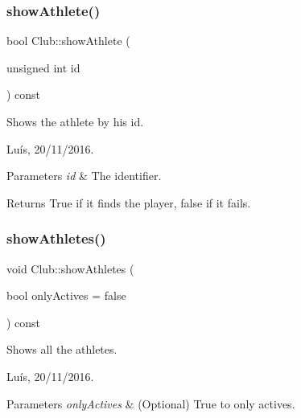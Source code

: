 \hypertarget{class_club_a0a4b9097d0be7470b4a547c13a86adcb}{}\label{class_club_a0a4b9097d0be7470b4a547c13a86adcb} 
\subsubsection{\texorpdfstring{show\+Athlete()}{showAthlete()}}
{\footnotesize\ttfamily bool Club\+::show\+Athlete (\begin{DoxyParamCaption}\item[{unsigned int}]{id }\end{DoxyParamCaption}) const}



Shows the athlete by his id. 

Luís, 20/11/2016. 


\begin{DoxyParams}{Parameters}
{\em id} & The identifier. \\
\hline
\end{DoxyParams}


\begin{DoxyReturn}{Returns}
True if it finds the player, false if it fails. 
\end{DoxyReturn}
\hypertarget{class_club_ab74a638a755a3d7b1239f418f8257c19}{}\label{class_club_ab74a638a755a3d7b1239f418f8257c19} 
\subsubsection{\texorpdfstring{show\+Athletes()}{showAthletes()}}
{\footnotesize\ttfamily void Club\+::show\+Athletes (\begin{DoxyParamCaption}\item[{bool}]{only\+Actives = {\ttfamily false} }\end{DoxyParamCaption}) const}



Shows all the athletes. 

Luís, 20/11/2016. 


\begin{DoxyParams}{Parameters}
{\em only\+Actives} & (Optional) True to only actives. \\
\hline
\end{DoxyParams}
\hypertarget{class_club_a55d6ed46c6d937143172a01ac8ddf7cc}{}\label{class_club_a55d6ed46c6d937143172a01ac8ddf7cc} 
